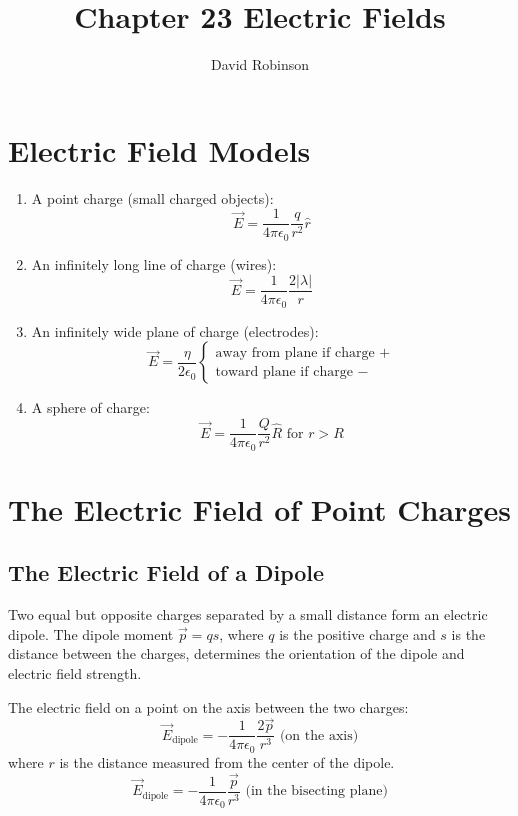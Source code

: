 \documentclass{article}
\title{Chapter 23 Electric Fields}
\author{David Robinson}
\date{}
\begin{document}
\maketitle

\section*{Electric Field Models}

\begin{enumerate}
    \item A point charge (small charged objects):
    \[\vec{E}=\frac{1}{4\pi\epsilon_0}\frac{q}{r^2}\hat{r}\]
    \item An infinitely long line of charge (wires):
    \[\vec{E}=\frac{1}{4\pi\epsilon_0}\frac{2|\lambda |}{r}\]
    \item An infinitely wide plane of charge (electrodes):
    \[\vec{E}=\frac{\eta}{2\epsilon_0}\begin{cases}
        \text{away from plane if charge } + \\
        \text{toward plane if charge } -
    \end{cases}\]
    \item A sphere of charge:
    \[\vec{E}=\frac{1}{4\pi\epsilon_0}\frac{Q}{r^2}\hat{R}\text{ for }r > R\]
\end{enumerate}

\section*{The Electric Field of Point Charges}

\subsection*{The Electric Field of a Dipole}

Two equal but opposite charges separated by a small distance form an electric dipole. The dipole
moment $\vec{p}=qs$, where $q$ is the positive charge and $s$ is the distance between the charges,
determines the orientation of the dipole and electric field strength. \newline

The electric field on a point on the axis between the two charges:
\[\vec{E}_{\text{dipole}}=-\frac{1}{4\pi\epsilon_0}\frac{2\vec{p}}{r^3} \text{ (on the axis)}\]
where $r$ is the distance measured from the center of the dipole.
\[\vec{E}_{\text{dipole}}=-\frac{1}{4\pi\epsilon_0}\frac{\vec{p}}{r^3} 
\text{ (in the bisecting plane)}\]
\end{document}
